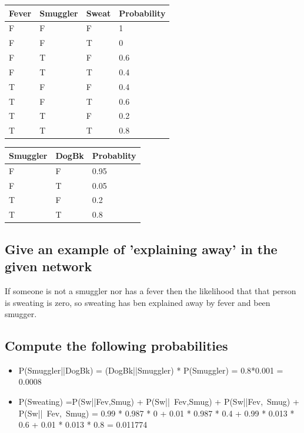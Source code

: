 \documentclass[paper=a4, fontsize=11pt]{scrartcl} %
\numberwithin{equation}{section} %
\numberwithin{figure}{section} %
\numberwithin{table}{section} %
\begin{document}
\begin{tabular}{|l|||l||| l ||l|}
\hline
Fever & Smuggler & Sweat & Probability\\
\hline
F & F & F & 1\\
\hline
F & F & T & 0 \\
\hline
F & T & F & 0.6\\
\hline

F & T & T & 0.4\\
\hline
T & F & F & 0.4\\
\hline
T & F & T & 0.6\\
\hline
T & T & F & 0.2\\
\hline
T & T & T & 0.8\\
\hline

\end{tabular}
\newline

\begin{tabular}{|l|||l||l|}
\hline
Smuggler & DogBk & Probablity\\
\hline
F & F & 0.95\\
\hline
F & T & 0.05\\
\hline
T & F & 0.2\\
\hline
T & T & 0.8\\
\hline
\end{tabular}





\subsection*{Give an example of 'explaining away' in the given network}

If someone is not a smuggler nor has a fever then the likelihood that that person is sweating is zero, so sweating has ben explained away by fever and been smugger.

\subsection*{Compute the following probabilities}
\begin{itemize}

\item P(Smuggler||DogBk) = (DogBk||Smuggler) * P(Smuggler) = 0.8*0.001 = 0.0008

\item P(Sweating) =P(Sw||Fev,Smug) + P(Sw||~Fev,Smug) + P(Sw||Fev,~Smug) + P(Sw||~Fev,~Smug) = 0.99 * 0.987 * 0 + 0.01 * 0.987 * 0.4 + 0.99 * 0.013 * 0.6 + 0.01 * 0.013 * 0.8 = 0.011774


\end{itemize}

\end{document}

